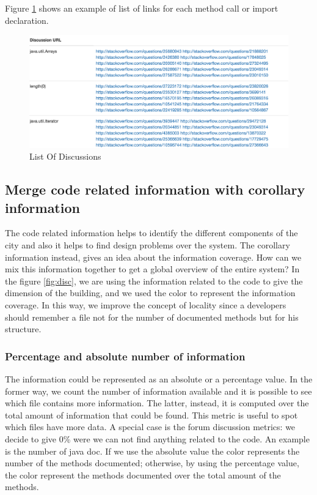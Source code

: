 \documentclass[]{usiinfbachelorproject}
\begin{document}
Figure \ref{fig:list} shows an example of list of links for each method call or import declaration.


 \begin{figure}[H]
	\centering
	\includegraphics[width=1\textwidth]{images/listOfDiscussions}
		\caption[List Of Discussions]{List Of Discussions \label{fig:list}
}

\end{figure}


\subsection{Merge code related information with corollary information}
The code related information helps to identify the different components of the city and also it helps to find design problems over the system. The corollary information instead, gives an idea about the information coverage. How can we mix this information together to get a global overview of the entire system? In the figure \ref{fig:disc}, we are using the information related to the code to give the dimension of the building, and we used the color to represent the information coverage. In this way, we improve the concept of locality since a developers should remember a file not for the number of documented methods but for his structure.

\subsubsection{Percentage and absolute number of information}

The information could be represented  as an absolute or a percentage value. In the former way, we count the number of information available and it is possible to see which file contains more information. The latter, instead, it is computed over the total amount of information that could be found. This metric is useful to spot which files have more data. A special case is the forum discussion metrics: we decide to give 0\%  were we can not find anything related to the code.
An example is the number of java doc. If we use the absolute value the color represents the number of the methods documented; otherwise, by using the percentage value, the color represent the methods documented over the total amount of the methods.
\end{document}
